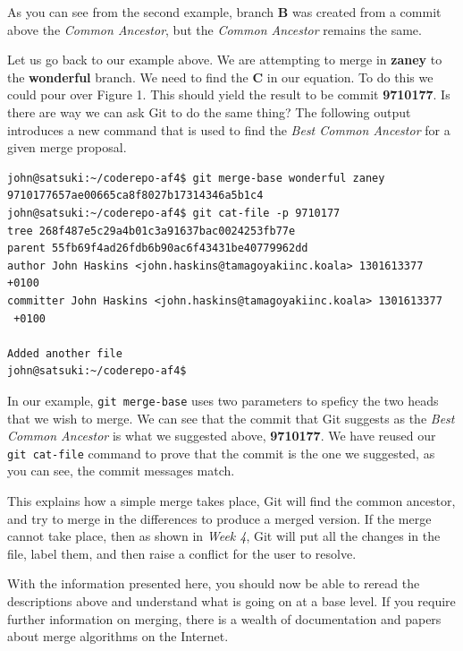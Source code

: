 As you can see from the second example, branch \textbf{B} was created from a commit above the \emph{Common Ancestor}, but the \emph{Common Ancestor} remains the same.  

Let us go back to our example above.  We are attempting to merge in \textbf{zaney} to the \textbf{wonderful} branch.  We need to find the \textbf{C} in our equation.  To do this we could pour over Figure 1.  This should yield the result to be commit \textbf{9710177}.  Is there are way we can ask Git to do the same thing?  The following output introduces a new command that is used to find the \emph{Best Common Ancestor} for a given merge proposal.

\begin{Verbatim}[frame=leftline,framerule=1mm,fontsize=\relsize{-3}] 
john@satsuki:~/coderepo-af4$ git merge-base wonderful zaney
9710177657ae00665ca8f8027b17314346a5b1c4
john@satsuki:~/coderepo-af4$ git cat-file -p 9710177
tree 268f487e5c29a4b01c3a91637bac0024253fb77e
parent 55fb69f4ad26fdb6b90ac6f43431be40779962dd
author John Haskins <john.haskins@tamagoyakiinc.koala> 1301613377 +0100
committer John Haskins <john.haskins@tamagoyakiinc.koala> 1301613377 
 +0100

Added another file
john@satsuki:~/coderepo-af4$ 
\end{Verbatim}

In our example, \texttt{git merge-base} uses two parameters to speficy the two heads that we wish to merge.  We can see that the commit that Git suggests as the \emph{Best Common Ancestor} is what we suggested above, \textbf{9710177}.  We have reused our \texttt{git cat-file} command to prove that the commit is the one we suggested, as you can see, the commit messages match.

This explains how a simple merge takes place, Git will find the common ancestor, and try to merge in the differences to produce a merged version.  If the merge cannot take place, then as shown in \emph{Week 4}, Git will put all the changes in the file, label them, and then raise a conflict for the user to resolve.  

With the information presented here, you should now be able to reread the descriptions above and understand what is going on at a base level.  If you require further information on merging, there is a wealth of documentation and papers about merge algorithms on the Internet.

